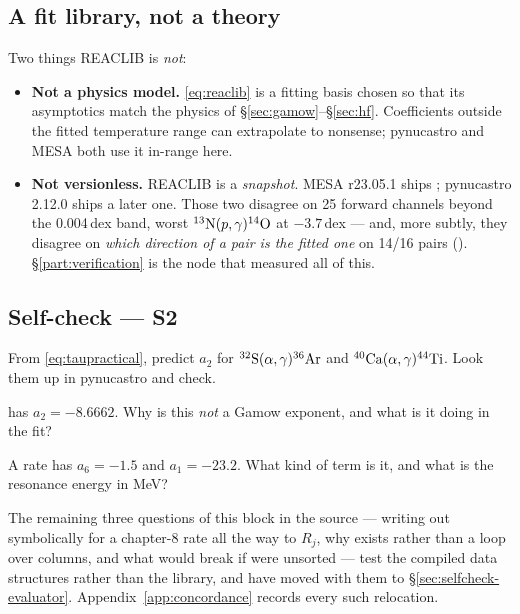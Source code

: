 \subsection{A fit library, not a theory}
\label{sec:fitnottheory}

Two things REACLIB is \emph{not}:

\begin{itemize}
\item \textbf{Not a physics model.} \eqref{eq:reaclib} is a fitting basis chosen
      so that its asymptotics match the physics of
      \S\ref{sec:gamow}--\S\ref{sec:hf}. Coefficients outside the fitted
      temperature range can extrapolate to nonsense; pynucastro and MESA both
      use it in-range here.
\item \textbf{Not versionless.} REACLIB is a \emph{snapshot}. MESA r23.05.1
      ships ; pynucastro 2.12.0 ships a later one. Those two
      disagree on 25 forward channels beyond the 0.004\,dex band, worst
      $\nuc{N}{13}(p,\gamma)\nuc{O}{14}$ at $-3.7$\,dex
       --- and, more subtly, they disagree on \emph{which
      direction of a pair is the fitted one} on 14/16 pairs ().
      \S\ref{part:verification} is the node that measured all of this.
\end{itemize}

\subsection*{Self-check --- S2}
\label{sec:selfcheck-reaclib}

\begin{selfcheck}
\item From \eqref{eq:taupractical}, predict $a_2$ for
      $\nuc{S}{32}(\alpha,\gamma)\nuc{Ar}{36}$ and
      $\nuc{Ca}{40}(\alpha,\gamma)\nuc{Ti}{44}$. Look them up in pynucastro and
      check.
\item {} has $a_2 = -8.6662$. Why is this \emph{not} a Gamow
      exponent, and what is it doing in the fit?
\item A rate has $a_6 = -1.5$ and $a_1 = -23.2$. What kind of term is it, and
      what is the resonance energy in MeV?
\end{selfcheck}

\begin{aside}
The remaining three questions of this block in the source --- writing out
 symbolically for a chapter-8 rate all the way to $R_j$, why
 exists rather than a loop over columns, and what would break
if  were unsorted --- test the compiled data structures rather
than the library, and have moved with them to
\S\ref{sec:selfcheck-evaluator}. Appendix~\ref{app:concordance} records every
such relocation.
\end{aside}
